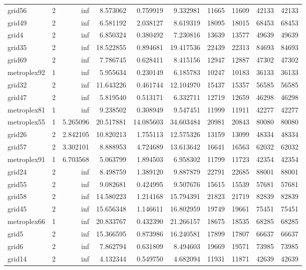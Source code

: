 \begin{longtable}{|l|r|r|r|r|r|r|r|r|r|}
grid56 & 2 & inf & 8.573062 & 0.759919 & 9.332981 & 11665 & 11609 & 42133 & 42133 \\
grid49 & 2 & inf & 6.581192 & 2.038127 & 8.619319 & 18095 & 18015 & 68453 & 68453 \\
grid4 & 2 & inf & 6.850324 & 0.380492 & 7.230816 & 13639 & 13577 & 49639 & 49639 \\
grid35 & 2 & inf & 18.522855 & 0.894681 & 19.417536 & 22439 & 22313 & 84693 & 84693 \\
grid69 & 2 & inf & 7.786745 & 0.628411 & 8.415156 & 12947 & 12887 & 47302 & 47302 \\
metroplex92 & 1 & inf & 5.955634 & 0.230149 & 6.185783 & 10247 & 10183 & 36133 & 36133 \\
grid32 & 2 & inf & 11.643226 & 0.461744 & 12.104970 & 15437 & 15357 & 56585 & 56585 \\
grid47 & 2 & inf & 5.819540 & 0.513171 & 6.332711 & 12719 & 12659 & 46298 & 46298 \\
metroplex81 & 1 & inf & 9.238502 & 0.308949 & 9.547451 & 11999 & 11911 & 42277 & 42277 \\
metroplex55 & 1 & 5.265096 & 20.517881 & 14.085603 & 34.603484 & 20981 & 20843 & 80080 & 80080 \\
grid26 & 2 & 2.842105 & 10.820213 & 1.755113 & 12.575326 & 13159 & 13099 & 48334 & 48334 \\
grid57 & 2 & 3.302101 & 8.888953 & 4.724689 & 13.613642 & 16641 & 16563 & 62032 & 62032 \\
metroplex91 & 1 & 6.703568 & 5.063799 & 1.894503 & 6.958302 & 11799 & 11723 & 42354 & 42354 \\
grid24 & 2 & inf & 8.498759 & 1.389120 & 9.887879 & 22791 & 22685 & 88001 & 88001 \\
grid55 & 2 & inf & 9.082681 & 0.424995 & 9.507676 & 15615 & 15539 & 57681 & 57681 \\
grid58 & 2 & inf & 14.580223 & 1.214168 & 15.794391 & 21823 & 21719 & 82839 & 82839 \\
grid45 & 2 & inf & 15.656348 & 1.146611 & 16.802959 & 19749 & 19661 & 75451 & 75451 \\
metroplex66 & 1 & inf & 20.833767 & 0.432390 & 21.266157 & 18675 & 18535 & 68285 & 68285 \\
grid5 & 2 & inf & 15.366595 & 0.873986 & 16.240581 & 17899 & 17807 & 66637 & 66637 \\
grid6 & 2 & inf & 7.862794 & 0.631809 & 8.494603 & 19669 & 19571 & 73985 & 73985 \\
grid14 & 2 & inf & 4.132344 & 0.549750 & 4.682094 & 11931 & 11871 & 42639 & 42639 \\

\end{longtable}
